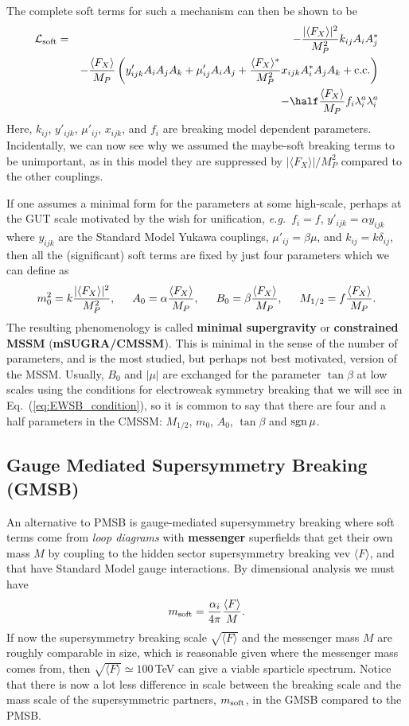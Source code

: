 \documentclass[notes.tex]{subfiles}
\begin{document}
The complete soft terms for such a mechanism can then be shown to be
\begin{eqnarray}
\mathcal{L}_\text{soft} &=& - \frac{|\langle F_X \rangle |^2}{M_P^2}k_{ij}A_iA_j^* \nonumber\\
 &&-\frac{\langle F_X \rangle}{M_P}\left(y'_{ijk}A_i A_j A_k + \mu'_{ij}A_iA_j + \frac{\langle F_X \rangle^*}{M_P^2}x_{ijk}A_i^*A_jA_k + {\rm c.c.}\right) \\
&&-\half \frac{\langle F_X \rangle}{M_P} f_i \lambda^a_i \lambda^a_i   \nonumber  
 \end{eqnarray}
Here,  $k_{ij}$, $y'_{ijk}$, $\mu'_{ij}$, $x_{ijk}$, and $ f_i $ are breaking model dependent parameters.
Incidentally, we can now see why we assumed the maybe-soft breaking terms to be unimportant, as  in this model they are suppressed by $|\langle F_X \rangle|/M_P^2$ compared to the other couplings. 

If one assumes a minimal form for the parameters at some high-scale, perhaps at the GUT scale motivated by the wish for unification, {\it e.g.}\ $f_i=f$, $y'_{ijk} = \alpha y_{ijk}$ where $y_{ijk}$ are the Standard Model Yukawa couplings, $\mu'_{ij} = \beta \mu$, and $k_{ij} = k\delta_{ij}$, then all the (significant) soft terms are fixed by just four parameters which we can define as
\[m_0^2 = k \frac{|\langle F_X \rangle|^2}{M_P^2}, \indent A_0 = \alpha \frac{\langle F_X \rangle }{M_P}, \indent B_0 = \beta\frac{\langle F_X \rangle}{M_P},\indent  M_{1/2} = f\frac{\langle F_X \rangle}{M_P}.\]
The resulting phenomenology is called {\bf minimal supergravity} or {\bf constrained MSSM} ({\bf mSUGRA/CMSSM}). This is minimal in the sense of the number of parameters, and is the most studied, but perhaps not best motivated, version of the MSSM. Usually, $B_0$ and $|\mu|$ are exchanged for the parameter $\tan\beta$ at low scales using the conditions for electroweak symmetry breaking that we will see in Eq.~(\ref{eq:EWSB_condition}), so it is common to say that there are four and a half parameters in the CMSSM: $M_{1/2}$, $m_0$, $A_0$, $\tan\beta$ and ${\rm sgn}\,\mu$.


\subsection{Gauge Mediated Supersymmetry Breaking (GMSB)} 
An alternative to PMSB is gauge-mediated supersymmetry breaking where soft terms come from {\it loop diagrams} with {\bf messenger} superfields that get their own mass $M$ by coupling to the hidden sector supersymmetry breaking vev $\langle F \rangle$, and that have Standard Model gauge interactions. By dimensional analysis we must have
\[m_{\rm soft} = \frac{\alpha_i}{4\pi}\frac{\langle F \rangle}{M}.\]
If now the supersymmetry breaking scale  $\sqrt{\langle F\rangle}$ and the messenger mass $M$ are roughly comparable in size, which is reasonable given where the messenger mass comes from, then $\sqrt{\langle F \rangle} \simeq 100$\,TeV can give a viable sparticle spectrum. Notice that there is now a lot less difference in scale between the breaking scale and the mass scale of the supersymmetric partners, $m_{\rm soft}$, in the GMSB compared to the PMSB.
\end{document}
